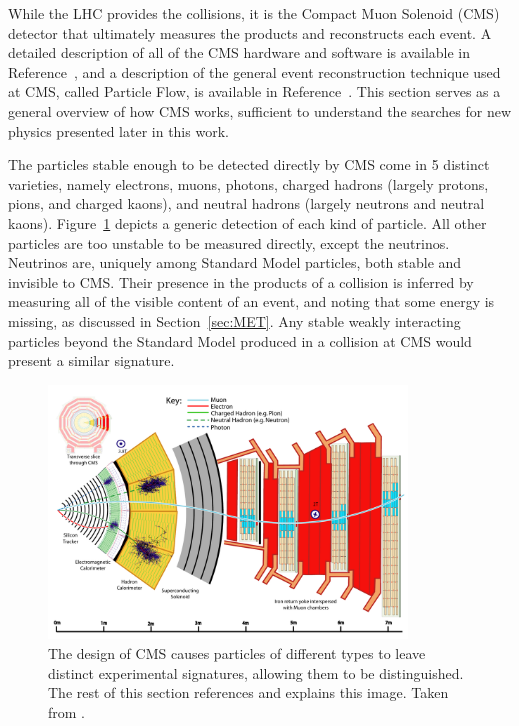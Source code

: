   While the LHC provides the collisions, it is the Compact Muon Solenoid (CMS) detector that ultimately measures the products and reconstructs each event.
  A detailed description of all of the CMS hardware and software is available in Reference~\cite{cms_tdr}, and a description of the general event reconstruction technique used at CMS, called Particle Flow, is available in Reference~\cite{particleflow}.
  This section serves as a general overview of how CMS works, sufficient to understand the searches for new physics presented later in this work.

  The particles stable enough to be detected directly by CMS come in 5 distinct varieties, namely electrons, muons, photons, charged hadrons (largely protons, pions, and charged kaons), and neutral hadrons (largely neutrons and neutral kaons).
  Figure~\ref{fig:cmsreconstruction} depicts a generic detection of each kind of particle.
  All other particles are too unstable to be measured directly, except the neutrinos.
  Neutrinos are, uniquely among Standard Model particles, both stable and invisible to CMS.
  Their presence in the products of a collision is inferred by measuring all of the visible content of an event, and noting that some energy is missing, as discussed in Section~\ref{sec:MET}.
  Any stable weakly interacting particles beyond the Standard Model produced in a collision at CMS would present a similar signature.

  \begin{figure}[h!]
    \centering
    \includegraphics[width=0.85\textwidth]{figures/cmsreconstruction.pdf}
    \caption[Image depicting the experimental signatures of different types of particle at CMS.]{
      The design of CMS causes particles of different types to leave distinct experimental signatures, allowing them to be distinguished.
      The rest of this section references and explains this image.
      Taken from \cite{particleflow}.}
    \label{fig:cmsreconstruction}
  \end{figure}  


